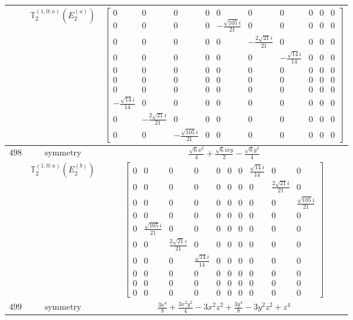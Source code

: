 \documentclass[fleqn,8pt,landscape]{jsarticle}
\begin{document}
\begin{longtable}{ccc}
$  $ & $ \mathbb{T}_{2}^{(1,0;a)}(E_{2}^{(a)}) $ & $ \begin{bmatrix} 0 & 0 & 0 & 0 & 0 & 0 & 0 & 0 & 0 & 0 \\ 0 & 0 & 0 & 0 & - \frac{\sqrt{105} i}{21} & 0 & 0 & 0 & 0 & 0 \\ 0 & 0 & 0 & 0 & 0 & - \frac{2 \sqrt{21} i}{21} & 0 & 0 & 0 & 0 \\ 0 & 0 & 0 & 0 & 0 & 0 & - \frac{\sqrt{14} i}{14} & 0 & 0 & 0 \\ 0 & 0 & 0 & 0 & 0 & 0 & 0 & 0 & 0 & 0 \\ 0 & 0 & 0 & 0 & 0 & 0 & 0 & 0 & 0 & 0 \\ 0 & 0 & 0 & 0 & 0 & 0 & 0 & 0 & 0 & 0 \\ - \frac{\sqrt{14} i}{14} & 0 & 0 & 0 & 0 & 0 & 0 & 0 & 0 & 0 \\ 0 & - \frac{2 \sqrt{21} i}{21} & 0 & 0 & 0 & 0 & 0 & 0 & 0 & 0 \\ 0 & 0 & - \frac{\sqrt{105} i}{21} & 0 & 0 & 0 & 0 & 0 & 0 & 0 \end{bmatrix} $ \\ \hline
$ 498 $ & $ \text{symmetry} $ & $ \frac{\sqrt{6} x^{2}}{4} + \frac{\sqrt{6} i x y}{2} - \frac{\sqrt{6} y^{2}}{4} $ \\
$  $ & $ \mathbb{T}_{2}^{(1,0;a)}(E_{2}^{(b)}) $ & $ \begin{bmatrix} 0 & 0 & 0 & 0 & 0 & 0 & 0 & \frac{\sqrt{14} i}{14} & 0 & 0 \\ 0 & 0 & 0 & 0 & 0 & 0 & 0 & 0 & \frac{2 \sqrt{21} i}{21} & 0 \\ 0 & 0 & 0 & 0 & 0 & 0 & 0 & 0 & 0 & \frac{\sqrt{105} i}{21} \\ 0 & 0 & 0 & 0 & 0 & 0 & 0 & 0 & 0 & 0 \\ 0 & \frac{\sqrt{105} i}{21} & 0 & 0 & 0 & 0 & 0 & 0 & 0 & 0 \\ 0 & 0 & \frac{2 \sqrt{21} i}{21} & 0 & 0 & 0 & 0 & 0 & 0 & 0 \\ 0 & 0 & 0 & \frac{\sqrt{14} i}{14} & 0 & 0 & 0 & 0 & 0 & 0 \\ 0 & 0 & 0 & 0 & 0 & 0 & 0 & 0 & 0 & 0 \\ 0 & 0 & 0 & 0 & 0 & 0 & 0 & 0 & 0 & 0 \\ 0 & 0 & 0 & 0 & 0 & 0 & 0 & 0 & 0 & 0 \end{bmatrix} $ \\ \hline
$ 499 $ & $ \text{symmetry} $ & $ \frac{3 x^{4}}{8} + \frac{3 x^{2} y^{2}}{4} - 3 x^{2} z^{2} + \frac{3 y^{4}}{8} - 3 y^{2} z^{2} + z^{4} $ \\

\end{longtable}
\end{document}
